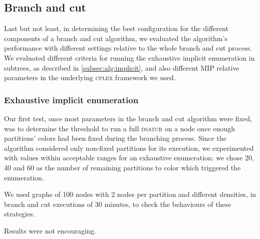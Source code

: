 
\subsection{Branch and cut}
\label{subsec:resultsbnc}

Last but not least, in determining the best configuration for the different components of a branch and cut algorithm, we evaluated the algorithm's performance with different settings relative to the whole branch and cut process. We evaluated different criteria for running the exhaustive implicit enumeration in subtrees, as described in \ref{subsec:alg:implicit}, and also different MIP relative parameters in the underlying \textsc{cplex} framework we used.

\subsubsection{Exhaustive implicit enumeration}

Our first test, once most parameters in the branch and cut algorithm were fixed, was to determine the threshold to run a full \textsc{dsatur} on a node once enough partitions' colors had been fixed during the branching process. Since the algorithm considered only non-fixed partitions for its execution, we experimented with values within acceptable ranges for an exhaustive enumeration: we chose 20, 40 and 60 as the number of remaining partitions to color which triggered the enumeration.

We used graphs of 100 nodes with 2 nodes per partition and different densities, in branch and cut executions of 30 minutes, to check the behaviours of these strategies.

Results were not encouraging. 

